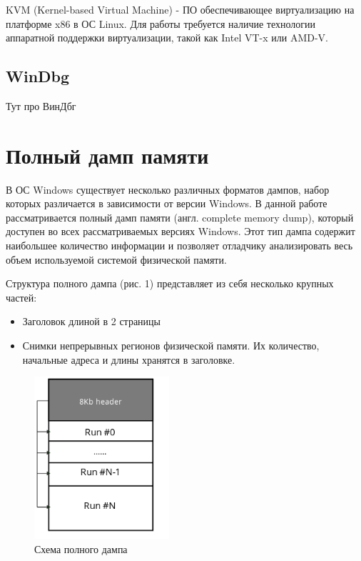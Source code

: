 \documentclass{mipt-thesis-bs}
\begin{document}
KVM (Kernel-based Virtual Machine) - ПО обеспечивающее виртуализацию на платформе x86 в ОС Linux. Для работы требуется наличие технологии аппаратной поддержки виртуализации, такой как Intel VT-x или AMD-V.

\section*{WinDbg}
Тут про ВинДбг 

\chapter{Полный дамп памяти}

В ОС Windows существует несколько различных форматов дампов, набор которых различается в зависимости от версии Windows. В данной работе рассматривается полный дамп памяти (англ. complete memory dump), который доступен во всех рассматриваемых версиях Windows. Этот тип дампа содержит наибольшее количество информации и позволяет отладчику анализировать весь объем используемой системой физической памяти.

Структура полного дампа (рис. 1) представляет из себя несколько крупных частей:

\begin{itemize}
    \item Заголовок длиной в 2 страницы
    \item Снимки непрерывных регионов физической памяти. Их количество, начальные адреса и длины хранятся в заголовке.
\end{itemize}

\begin{figure}[h]
\begin{center}
    \includegraphics[width=5cm]{dmp_scheme1.png}
    \caption{Схема полного дампа}
\end{center}
\end{figure}
\end{document}
